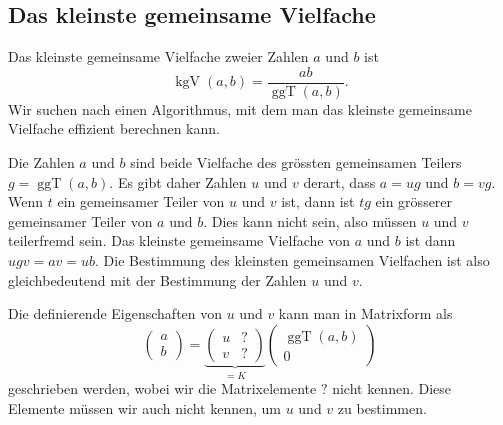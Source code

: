 %
%
\subsection{Das kleinste gemeinsame Vielfache
\label{buch:subsection:daskgv}}
%
%
Das kleinste gemeinsame Vielfache zweier Zahlen $a$ und $b$ ist
\[
\operatorname{kgV}(a,b)
=
\frac{ab}{\operatorname{ggT}(a,b)}.
\]
Wir suchen nach einen Algorithmus, mit dem man das kleinste gemeinsame
Vielfache effizient berechnen kann.

Die Zahlen $a$ und $b$ sind beide Vielfache des grössten gemeinsamen
Teilers $g=\operatorname{ggT}(a,b)$.
Es gibt daher Zahlen $u$ und $v$ derart, dass $a=ug$ und $b=vg$.
Wenn $t$ ein gemeinsamer Teiler von $u$ und $v$ ist, dann ist $tg$ ein
grösserer gemeinsamer Teiler von $a$ und $b$.
Dies kann nicht sein, also müssen $u$ und $v$ teilerfremd sein.
Das kleinste gemeinsame Vielfache von $a$ und $b$ ist dann $ugv=av=ub$.
Die Bestimmung des kleinsten gemeinsamen Vielfachen ist also gleichbedeutend
mit der Bestimmung der Zahlen $u$ und $v$.

Die definierende Eigenschaften von $u$ und $v$ kann man in Matrixform als
%
\begin{equation}
\begin{pmatrix}
a\\b
\end{pmatrix}
=
\underbrace{
\begin{pmatrix}
u&?\\
v&?
\end{pmatrix}}_{\displaystyle =K}
\begin{pmatrix}
\operatorname{ggT}(a,b)\\ 0
\end{pmatrix}
\label{buch:eindlichekoerper:eqn:uvmatrix}
\end{equation}
geschrieben werden, wobei wir die Matrixelemente $?$ nicht kennen.
Diese Elemente müssen wir auch nicht kennen, um $u$ und $v$ zu bestimmen.

